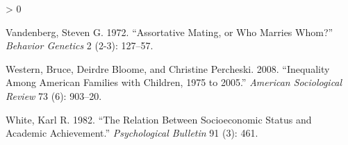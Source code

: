 \documentclass[
]{article}
\newlength{\cslhangindent}
\newenvironment{CSLReferences}[2] %
 {%
  \setlength{\parindent}{0pt}
  \ifodd #1 \everypar{\setlength{\hangindent}{\cslhangindent}}\ignorespaces\fi
  \ifnum #2 > 0
  \setlength{\parskip}{#2\baselineskip}
  \fi
 }%
 {}
\begin{document}
\begin{CSLReferences}{1}{0}
\leavevmode\hypertarget{ref-vandenberg1972assortative}{}%
Vandenberg, Steven G. 1972. {``Assortative Mating, or Who Marries Whom?''} \emph{Behavior Genetics} 2 (2-3): 127--57.

\leavevmode\hypertarget{ref-western2008inequality}{}%
Western, Bruce, Deirdre Bloome, and Christine Percheski. 2008. {``Inequality Among American Families with Children, 1975 to 2005.''} \emph{American Sociological Review} 73 (6): 903--20.

\leavevmode\hypertarget{ref-white1982relation}{}%
White, Karl R. 1982. {``The Relation Between Socioeconomic Status and Academic Achievement.''} \emph{Psychological Bulletin} 91 (3): 461.

\end{CSLReferences}
\end{document}
